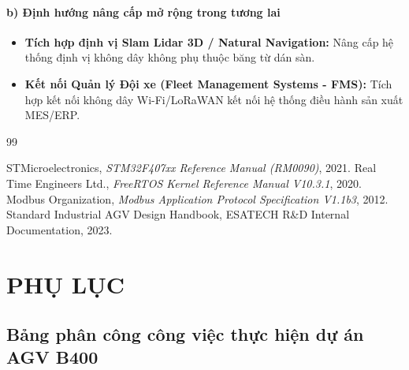 \documentclass{article}
\begin{document}
\paragraph{b) Định hướng nâng cấp mở rộng trong tương lai}
\begin{itemize}
    \item \textbf{Tích hợp định vị Slam Lidar 3D / Natural Navigation:} Nâng cấp hệ thống định vị không dây không phụ thuộc băng từ dán sàn.
    \item \textbf{Kết nối Quản lý Đội xe (Fleet Management Systems - FMS):} Tích hợp kết nối không dây Wi-Fi/LoRaWAN kết nối hệ thống điều hành sản xuất MES/ERP.
\end{itemize}

\newpage

\begin{thebibliography}{99}

 STMicroelectronics, \emph{STM32F407xx Reference Manual (RM0090)}, 2021.
 Real Time Engineers Ltd., \emph{FreeRTOS Kernel Reference Manual V10.3.1}, 2020.
 Modbus Organization, \emph{Modbus Application Protocol Specification V1.1b3}, 2012.
 Standard Industrial AGV Design Handbook, ESATECH R\&D Internal Documentation, 2023.

\end{thebibliography}

\newpage

\section*{PHỤ LỤC}

\subsection*{Bảng phân công công việc thực hiện dự án AGV B400}
\end{document}
